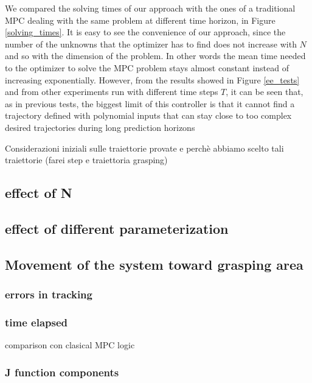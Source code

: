 We compared the solving times of our approach with the ones of a traditional MPC dealing with the same problem at different time horizon, in Figure \ref{solving_times}. It is easy to see the convenience of our approach, since the number of the unknowns that the optimizer has to find does not increase with $N$ and so with the dimension of the problem. In other words the mean time needed to the optimizer to solve the MPC problem stays almost constant instead of increasing exponentially.
However, from the results showed in Figure \ref{ee_tests} and from other experiments run with different time steps $T$, it can be seen that, as in previous tests, the biggest limit of this controller is that it cannot find a trajectory defined with polynomial inputs that can stay close to too complex desired trajectories during long prediction horizons

Considerazioni iniziali sulle traiettorie provate e perchè abbiamo scelto tali traiettorie (farei step e traiettoria grasping)
	\subsection{effect of N}
		
	\subsection{effect of different parameterization}
		
	\subsection{Movement of the system toward grasping area}

		\subsubsection{errors in tracking}
			
		\subsubsection{time elapsed}
			comparison con clasical MPC logic
		\subsubsection{J function components}

